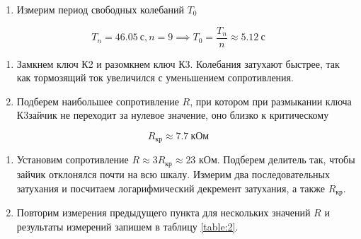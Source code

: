 \documentclass[a4paper,12pt]{article}
\begin{document}
\begin{enumerate}[resume]
    \item Измерим период свободных колебаний $T_0$
\end{enumerate}

\begin{equation*}
    T_n = 46.05 \ \text{с}, n = 9 \implies T_0 = \frac{T_n}{n} \approx 5.12 \ \text{с}
\end{equation*}

\begin{enumerate}[resume]
    \item Замкнем ключ К2 и разомкнем ключ К3. Колебания затухают быстрее, так как тормозящий ток увеличился с уменьшением сопротивления.
    \item Подберем наибольшее сопротивление $R$, при котором при размыкании ключа К3зайчик не переходит за нулевое значение, оно близко к критическому
\end{enumerate}

\begin{equation*}
    R_\text{кр} \approx 7.7 \ \text{кОм}
\end{equation*}

\begin{enumerate}[resume]
    \item Установим сопротивление $R \approx 3R_\text{кр} \approx 23$ кОм. Подберем делитель так, чтобы зайчик отклонялся почти на всю шкалу. Измерим два последовательных затухания и посчитаем логарифмический декремент затухания, а также $R_\text{кр}$.
    \item Повторим измерения предыдущего пункта для нескольких значений $R$ и результаты измерений запишем в таблицу \ref{table:2}.
\end{enumerate}
\end{document}
